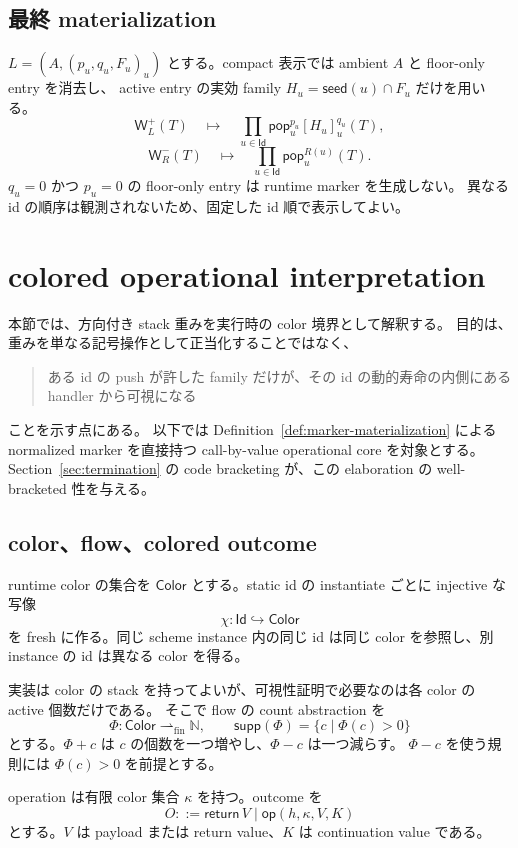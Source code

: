 \documentclass[uplatex,dvipdfmx,a4paper,10.5pt]{jsarticle}
\theoremstyle{jpplain}
\newcommand{\Id}{\mathsf{Id}}
\newcommand{\Nat}{\mathbb N}
\newcommand{\PWeight}[2]{\mathsf{W}^{+}_{#1}(#2)}
\newcommand{\NWeight}[2]{\mathsf{W}^{-}_{#1}(#2)}
\newcommand{\takeop}[2]{[#1]_{#2}}
\newcommand{\popop}[1]{\mathsf{pop}_{#1}}
\newcommand{\Color}{\mathsf{Color}}
\newcommand{\supp}{\mathsf{supp}}
\newcommand{\ret}{\mathsf{return}\,}
\newcommand{\oper}{\mathsf{op}}
\newcommand{\seedcap}{\mathsf{seed}}
\begin{document}
\subsection{最終 materialization}

$L=(A,(p_u,q_u,F_u)_u)$ とする。compact 表示では ambient $A$ と floor-only entry を消去し、
active entry の実効 family $H_u=\seedcap(u)\cap F_u$ だけを用いる。
\[
\PWeight{L}{T}
\quad\mapsto\quad
\prod_{u\in\Id}\popop{u}^{p_u}\takeop{H_u}{u}^{q_u}(T),
\]
\[
\NWeight{R}{T}
\quad\mapsto\quad
\prod_{u\in\Id}\popop{u}^{R(u)}(T).
\]
$q_u=0$ かつ $p_u=0$ の floor-only entry は runtime marker を生成しない。
異なる id の順序は観測されないため、固定した id 順で表示してよい。

\section{colored operational interpretation}\label{sec:colored}

本節では、方向付き stack 重みを実行時の color 境界として解釈する。
目的は、重みを単なる記号操作として正当化することではなく、
\begin{quote}
ある id の push が許した family だけが、その id の動的寿命の内側にある handler から可視になる
\end{quote}
ことを示す点にある。
以下では Definition~\ref{def:marker-materialization} による normalized marker を直接持つ
call-by-value operational core を対象とする。Section~\ref{sec:termination} の code bracketing が、この elaboration の well-bracketed 性を与える。

\subsection{color、flow、colored outcome}

runtime color の集合を $\Color$ とする。static id の instantiate ごとに injective な写像
\[
  \chi:\Id\hookrightarrow\Color
\]
を fresh に作る。同じ scheme instance 内の同じ id は同じ color を参照し、別 instance の id は異なる color を得る。

実装は color の stack を持ってよいが、可視性証明で必要なのは各 color の active 個数だけである。
そこで flow の count abstraction を
\[
  \Phi:\Color\rightharpoonup_{\mathrm{fin}}\Nat,
  \qquad
  \supp(\Phi)=\{c\mid\Phi(c)>0\}
\]
とする。$\Phi+c$ は $c$ の個数を一つ増やし、$\Phi-c$ は一つ減らす。
$\Phi-c$ を使う規則には $\Phi(c)>0$ を前提とする。

operation は有限 color 集合 $\kappa$ を持つ。outcome を
\[
  O ::= \ret V \mid \oper(h,\kappa,V,K)
\]
とする。$V$ は payload または return value、$K$ は continuation value である。
\end{document}
